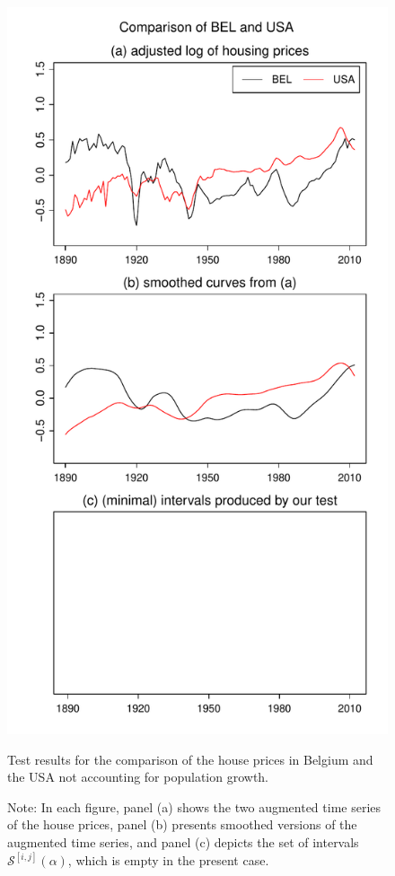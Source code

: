 \documentclass[a4paper,12pt]{article}
\begin{document}
\begin{enumerate}[label=\arabic*.,leftmargin=0.6cm]
\begin{figure}[t!]
\hspace{0.1cm}
\begin{minipage}[t]{0.48\textwidth}
\includegraphics[width=\textwidth]{output/BEL_vs_USA}
\caption{Test results for the comparison of the house prices in Belgium and the USA not accounting for population growth.}\label{fig:hp:Belgium:USA}
\end{minipage}
\caption*{Note: In each figure, panel (a) shows the two augmented time series of the house prices, panel (b) presents smoothed versions of the augmented time series, and panel (c) depicts the set of intervals $\mathcal{S}^{[i, j]}(\alpha)$, which is empty in the present case.}
\end{figure}


\end{enumerate}
\end{document}
